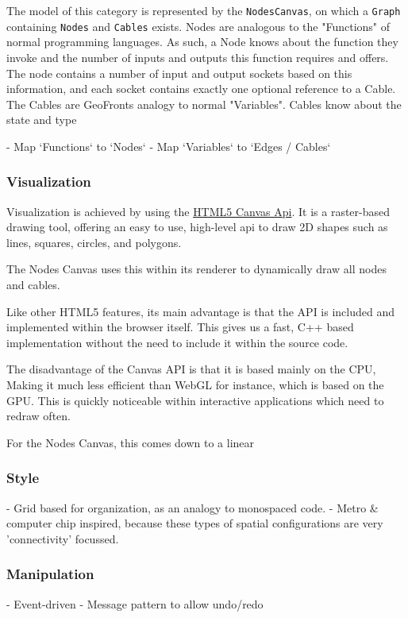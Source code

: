 The model of this category is represented by the \verb|NodesCanvas|, on which a \verb|Graph| containing \verb|Nodes| and \verb|Cables| exists. 
Nodes are analogous to the "Functions" of normal programming languages.
As such, a Node knows about the function they invoke and the number of inputs and outputs this function requires and offers. 
The node contains a number of input and output sockets based on this information, and each socket contains exactly one optional reference to a Cable.  
The Cables are GeoFronts analogy to normal "Variables". Cables know about the state and type 
 


  - Map `Functions` to `Nodes`
  - Map `Variables` to `Edges / Cables`

\subsubsection{Visualization}
Visualization is achieved by using the \href{https://developer.mozilla.org/en-US/docs/Web/API/Canvas_API}{HTML5 Canvas Api}. It is a raster-based drawing tool, offering an easy to use, high-level api to draw 2D shapes such as lines, squares, circles, and polygons. 

The Nodes Canvas uses this within its renderer to dynamically draw all nodes and cables. 


Like other HTML5 features, its main advantage is that the API is included and implemented within the browser itself. This gives us a fast, C++ based implementation without the need to include it within the source code.

The disadvantage  of the Canvas API is that it is based mainly on the CPU, Making it much less efficient than WebGL for instance, which is based on the GPU. This is quickly noticeable within interactive applications which need to redraw often. 

For the Nodes Canvas, this comes down to a linear 


\subsubsection{Style}
- Grid based for organization, as an analogy to monospaced code.
- Metro \& computer chip inspired, because these types of spatial configurations are very 'connectivity' focussed.

\subsubsection*{Manipulation}
  - Event-driven
  - Message pattern to allow undo/redo
   
